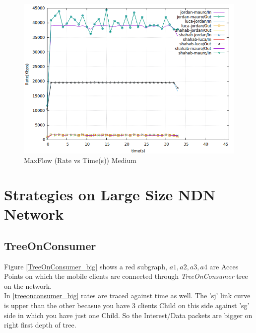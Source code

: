 \begin{figure}[H]

\begin{center}

\includegraphics[scale = 0.4]{Figures/maxflow.png}

\caption{MaxFlow (Rate vs Time(s)) Medium} \label{maxflow} 


\end{center}

\end{figure}




 

\section{Strategies on Large Size NDN Network}

\subsection{TreeOnConsumer}
Figure \ref{TreeOnConsumer_big} shows a red subgraph, $a1, a2, a3, a4$ are Acces Points on which the mobile clients are connected through \textit{TreeOnConsumer} tree on the network.\\
In \ref{treeonconsumer_big}  rates are traced against time as well. The 'sj' link curve is upper than the other becasue you have 3 clients Child on this side against 'sg' side in which you have just one Child. So the Interest/Data packets are bigger on right first depth of tree.

